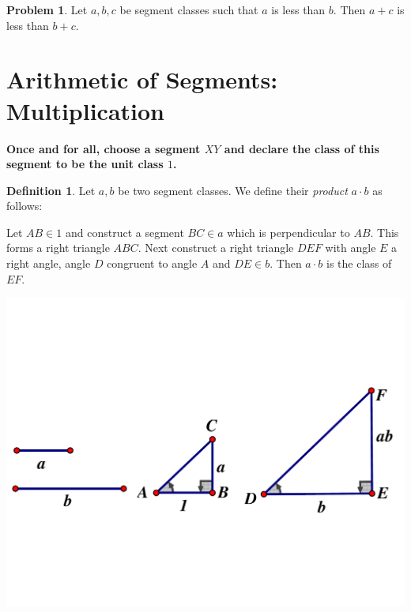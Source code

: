 \documentclass{amsart}
\theoremstyle{definition}
\newtheorem{problem}{Problem}[section]
\newtheorem*{definition}{Definition}
\begin{document}
\begin{problem}
Let $a, b, c$ be segment classes such that $a$ is less than $b$. Then $a+c$ is less than $b+c$.
\end{problem}


\vfill
\pagebreak


\setcounter{section}{1}
\renewcommand{\thesection}{\Alph{section}}
\section{Arithmetic of Segments: Multiplication}



\begin{center}
\textbf{Once and for all, choose a segment $XY$ and declare the class of this segment to be the unit class $1$.}
\end{center}

\begin{definition}
Let $a,b$ be two segment classes. We define their \emph{product} $a\cdot b$ as follows:

Let $AB\in 1$ and construct a segment $BC \in a$ which is perpendicular to $AB$. This forms a right triangle $ABC$. Next construct a right triangle $DEF$ with angle $E$ a right angle, angle $D$ congruent to angle $A$ and $DE \in b$. Then $a\cdot b$ is the class of $EF$.
\end{definition}

\begin{center}
\includegraphics[scale=.4]{product.pdf}
\end{center}
\end{document}
